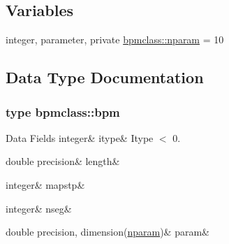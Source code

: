 \subsection*{Variables}
\begin{DoxyCompactItemize}
\item 
integer, parameter, private \mbox{\hyperlink{namespacebpmclass_ac2f2f373976236d08c9c68de895950eb}{bpmclass\+::nparam}} = 10
\end{DoxyCompactItemize}


\subsection{Data Type Documentation}
\label{structbpmclass_1_1bpm}
\subsubsection{type bpmclass\+::bpm}
\begin{DoxyFields}{Data Fields}
\mbox{\label{namespacebpmclass_a8759ea53c8b66bbdb08055405fff79a0}} 
integer&
itype&
Itype $<$ 0. \\
\hline

\mbox{\label{namespacebpmclass_a91bf471e42c1c733f27253fe367c02e1}} 
double precision&
length&
\\
\hline

\mbox{\label{namespacebpmclass_a57b5d567476a69c20de780f6fb8d0a2e}} 
integer&
mapstp&
\\
\hline

\mbox{\label{namespacebpmclass_af47828f23a39ecfbef81048d780c4107}} 
integer&
nseg&
\\
\hline

\mbox{\label{namespacebpmclass_ab4cbff356dd68d8a0563cb3b1d4ae235}} 
double precision, dimension(\mbox{\hyperlink{namespacebpmclass_ac2f2f373976236d08c9c68de895950eb}{nparam}})&
param&
\\
\hline

\end{DoxyFields}
